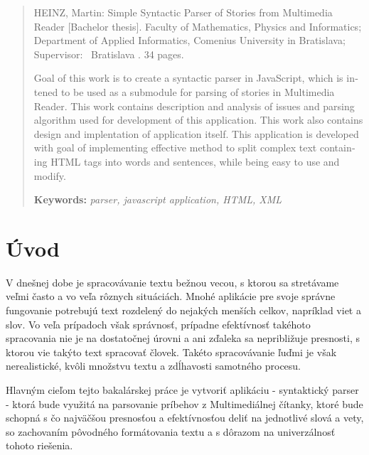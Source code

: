 \documentclass[12pt,a4paper]{report}
\theoremstyle{definition}
\theoremstyle{remark}
\begin{document}
\begin{otherlanguage}{english}
\begin{abstract}

HEINZ, Martin: Simple Syntactic Parser of Stories from Multimedia Reader [Bachelor thesis]. Faculty of Mathematics, Physics and Informatics;
Department of Applied Informatics, Comenius University in Bratislava; Supervisor: \skolitel \ Bratislava \rok. 34 pages.


\bigskip

Goal of this work is to create a syntactic parser in JavaScript, which is intened to be used as a submodule for parsing of stories in Multimedia Reader. This work contains description and analysis of issues and parsing algorithm used for development of this application. This work also contains design and implentation of application itself. This application is developed with goal of implementing effective method to split complex text containing HTML tags into words and sentences, while being easy to use and modify.

\bigskip\noindent
\textbf{Keywords:} \textit{parser, javascript application, HTML, XML} 



\end{abstract}
\end{otherlanguage}
\cleardoublepage
{}
\setcounter{tocdepth}{1}
\tableofcontents
\cleardoublepage
{}

\chapter*{Úvod}
V dnešnej dobe je spracovávanie textu bežnou vecou, s ktorou sa stretávame veľmi často a vo veľa rôznych situáciách. Mnohé aplikácie pre svoje správne fungovanie potrebujú text rozdelený do nejakých menších celkov, napríklad viet a slov. Vo veľa prípadoch však správnosť, prípadne efektívnosť takéhoto spracovania nie je na dostatočnej úrovni a ani zďaleka sa nepribližuje presnosti, s ktorou vie takýto text spracovať človek. Takéto spracovávanie ľuďmi je však nerealistické, kvôli množstvu textu a zdĺhavosti samotného procesu.



Hlavným cieľom tejto bakalárskej práce je vytvoriť aplikáciu  - syntaktický parser - ktorá bude využitá na parsovanie príbehov z Multimediálnej čítanky, ktoré bude schopná s čo najväčšou presnosťou a efektívnosťou deliť na jednotlivé slová a vety, so zachovaním pôvodného formátovania textu a s dôrazom na univerzálnosť tohoto riešenia.
\end{document}
